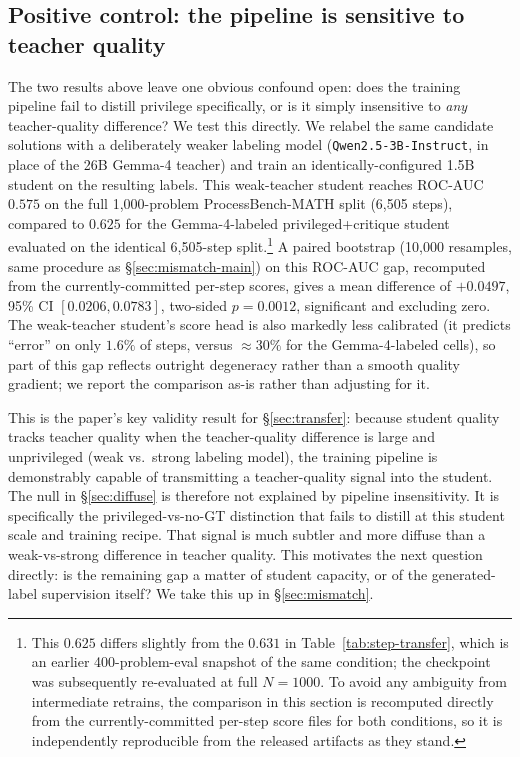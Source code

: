 \documentclass{article}
\begin{document}
\subsection{Positive control: the pipeline is sensitive to teacher quality}
\label{sec:positive-control}
The two results above leave one obvious confound open: does the training
pipeline fail to distill privilege specifically, or is it simply
insensitive to \emph{any} teacher-quality difference? We test this directly.
We relabel the same candidate solutions with a deliberately weaker labeling
model (\texttt{Qwen2.5-3B-Instruct}, in place of the 26B Gemma-4 teacher)
and train an identically-configured 1.5B student on the resulting labels.
This weak-teacher student reaches ROC-AUC $0.575$ on the full 1{,}000-problem
ProcessBench-MATH split (6{,}505 steps), compared to $0.625$ for the
Gemma-4-labeled privileged+critique student evaluated on the identical
6{,}505-step split.\footnote{This $0.625$ differs slightly from the $0.631$
in Table~\ref{tab:step-transfer}, which is an earlier 400-problem-eval
snapshot of the same condition; the checkpoint was subsequently re-evaluated
at full $N{=}1000$. To avoid any ambiguity from intermediate retrains, the
comparison in this section is recomputed directly from the currently-committed
per-step score files for both conditions, so it is independently reproducible
from the released artifacts as they stand.} A paired bootstrap
(10{,}000 resamples, same procedure as \S\ref{sec:mismatch-main}) on this
ROC-AUC gap, recomputed from the currently-committed per-step scores, gives
a mean difference of $+0.0497$, 95\% CI $[0.0206, 0.0783]$, two-sided
$p=0.0012$, significant and excluding zero. The weak-teacher student's score
head is also markedly
less calibrated (it predicts ``error'' on only $1.6\%$ of steps, versus
$\approx 30\%$ for the Gemma-4-labeled cells), so part of this gap reflects
outright degeneracy rather than a smooth quality gradient; we report the
comparison as-is rather than adjusting for it.

This is the paper's key validity result for \S\ref{sec:transfer}: because
student quality tracks teacher quality when the teacher-quality difference
is large and unprivileged (weak vs.\ strong labeling model), the training
pipeline is demonstrably capable of transmitting a teacher-quality signal
into the student. The null in \S\ref{sec:diffuse} is therefore not explained
by pipeline insensitivity. It is specifically the privileged-vs-no-GT
distinction that fails to distill at this student scale and training recipe.
That signal is much subtler and more diffuse than a weak-vs-strong difference
in teacher quality. This motivates the next question directly: is the remaining gap a
matter of student capacity, or of the generated-label supervision itself?
We take this up in \S\ref{sec:mismatch}.
\end{document}
